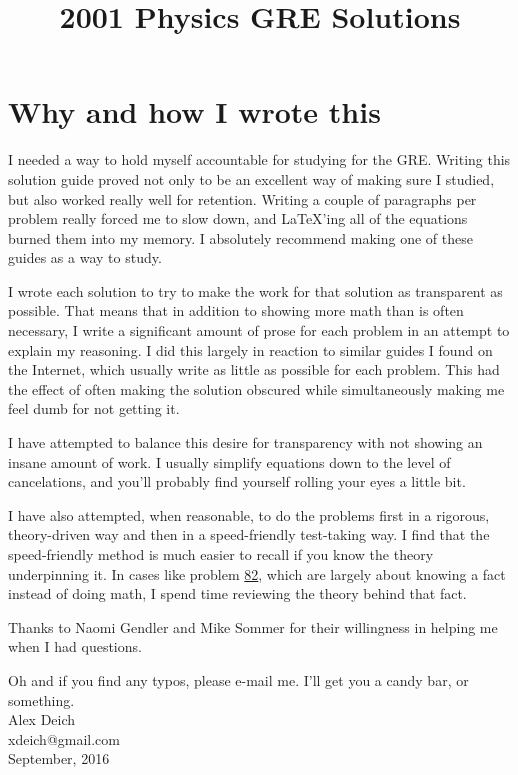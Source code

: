 \documentclass[11pt]{paper}
\title{2001 Physics GRE Solutions}
\begin{document}
\maketitle
\newpage
\section*{Why and how I wrote this}
I needed a way to hold myself accountable for studying for the GRE.  Writing this solution guide proved not only to be an excellent way of making sure I studied, but also worked really well for retention.  Writing a couple of paragraphs per problem really forced me to slow down, and \LaTeX'ing all of the equations burned them into my memory.  I absolutely recommend making one of these guides as a way to study.

I wrote each solution to try to make the work for that solution as transparent as possible.  That means that in addition to showing more math than is often necessary, I write a significant amount of prose for each problem in an attempt to explain my reasoning.  I did this largely in reaction to similar guides I found on the Internet, which usually write as little as possible for each problem.  This had the effect of often making the solution obscured while simultaneously making me feel dumb for not getting it.

I have attempted to balance this desire for transparency with not showing an insane amount of work.  I usually simplify equations down to the level of cancelations, and you'll probably find yourself rolling your eyes a little bit.

I have also attempted, when reasonable, to do the problems first in a rigorous, theory-driven way and then in a speed-friendly test-taking way.  I find that the speed-friendly method is much easier to recall if you know the theory underpinning it.  In cases like problem \hyperlink{section.82}{82}, which are largely about knowing a fact instead of doing math, I spend time reviewing the theory behind that fact.

Thanks to Naomi Gendler and Mike Sommer for their willingness in helping me when I had questions.

Oh and if you find any typos, please e-mail me.  I'll get you a candy bar, or something.\\

Alex Deich\\
\phantom{.}\hspace{10pt} xdeich@gmail.com\\
\phantom{.}\hspace{10pt} September, 2016
\newpage
\tableofcontents
\newpage
\end{document}
